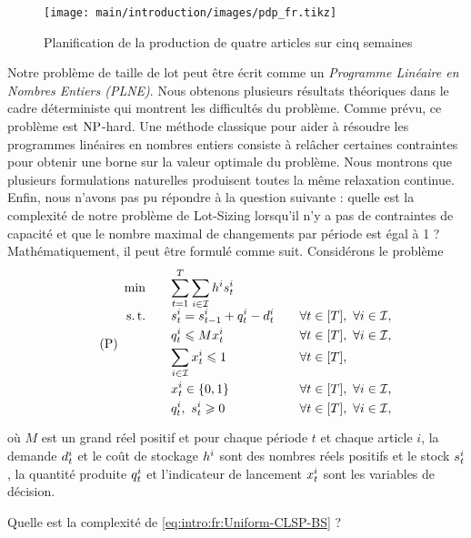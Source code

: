 \begin{figure}[!ht]
  \centering
  \texttt{[image: main/introduction/images/pdp\_fr.tikz]}
  \caption{Planification de la production de quatre articles sur cinq semaines}
  \label{fig:intro:fr:pdp}
\end{figure}


Notre problème de taille de lot peut être écrit comme un \emph{Programme Linéaire en Nombres Entiers (PLNE)}.
Nous obtenons plusieurs résultats théoriques dans le cadre déterministe qui montrent les difficultés du problème.
Comme prévu, ce problème est $\operatorname{NP}$-hard.
Une méthode classique pour aider à résoudre les programmes linéaires en nombres entiers consiste à relâcher certaines contraintes pour obtenir une borne sur la valeur optimale du problème.
Nous montrons que plusieurs formulations naturelles produisent toutes la même relaxation continue.
Enfin, nous n'avons pas pu répondre à la question suivante : quelle est la complexité de notre problème de Lot-Sizing lorsqu'il n'y a pas de contraintes de capacité et que le nombre maximal de changements par période est égal à 1 ?
Mathématiquement, il peut être formulé comme suit.
Considérons le problème
\begin{equation}\tag{P}\label{eq:intro:fr:Uniform-CLSP-BS}
  \begin{array}{rlll}
    \min\quad & \ds \sum_{t=1}^{\horizon} \sum_{i\in\REF} \holding^i \inventory_t^i
    \\ \smallskip
    \st\quad & \ds \inventory_t^i = \inventory_{t-1}^i + \quantity_t^i - \demand_t^i && \forall t\in\range{\horizon},\ \forall i\in\REF,
    \\ \smallskip
    & \ds \quantity_t^i \le M\setup_t^i && \forall t\in\range{\horizon},\ \forall i\in\REF,
    \\ \smallskip
    & \ds \sum_{i\in\REF} \setup_t^i \le 1 && \forall t\in\range{\horizon},
    \\ \smallskip
    & \ds \setup_t^i \in \crbracket{0,1} && \forall t\in\range{\horizon},\ \forall i\in\REF,
    \\ \smallskip
    & \ds \quantity_t^i,\ \inventory_t^i \ge 0 && \forall t\in\range{\horizon},\ \forall i\in\REF,
  \end{array}
\end{equation}
où $M$ est un grand réel positif et pour chaque période $t$ et chaque article $i$, la demande $d_t^i$ et le coût de stockage $h^i$ sont des nombres réels positifs et le stock $s_t^i$, la quantité produite $q_t^i$ et l'indicateur de lancement $x_t^i$ sont les variables de décision.
\begin{questionfr}
Quelle est la complexité de \eqref{eq:intro:fr:Uniform-CLSP-BS} ?
\end{questionfr}


